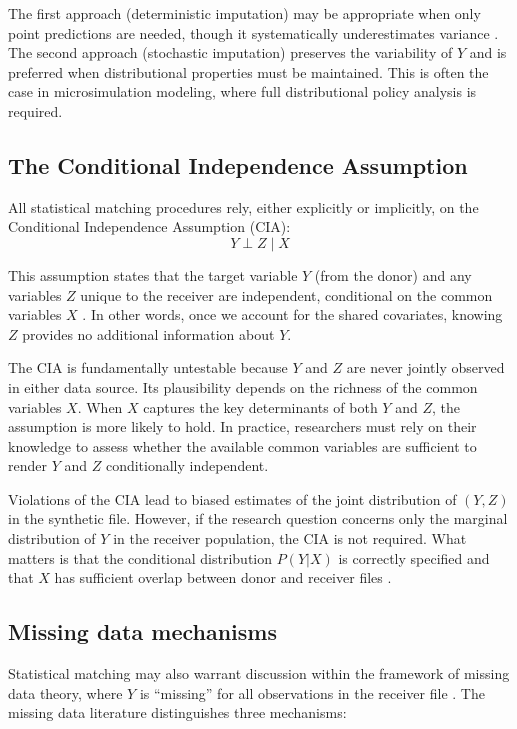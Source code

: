 The first approach (deterministic imputation) may be appropriate when only point predictions are needed, though it systematically underestimates variance \citep{rubin1987multiple}. The second approach (stochastic imputation) preserves the variability of $Y$ and is preferred when distributional properties must be maintained. This is often the case in microsimulation modeling, where full distributional policy analysis is required.

\subsection{The Conditional Independence Assumption}\label{sec:cia}

All statistical matching procedures rely, either explicitly or implicitly, on the Conditional Independence Assumption (CIA):
\begin{equation}
    Y \perp Z \mid X
\end{equation}

This assumption states that the target variable $Y$ (from the donor) and any variables $Z$ unique to the receiver are independent, conditional on the common variables $X$ \citep{dorazio2006statistical}. In other words, once we account for the shared covariates, knowing $Z$ provides no additional information about $Y$.

The CIA is fundamentally untestable because $Y$ and $Z$ are never jointly observed in either data source. Its plausibility depends on the richness of the common variables $X$. When $X$ captures the key determinants of both $Y$ and $Z$, the assumption is more likely to hold. In practice, researchers must rely on their knowledge to assess whether the available common variables are sufficient to render $Y$ and $Z$ conditionally independent.

Violations of the CIA lead to biased estimates of the joint distribution of $(Y, Z)$ in the synthetic file. However, if the research question concerns only the marginal distribution of $Y$ in the receiver population, the CIA is not required. What matters is that the conditional distribution $P(Y|X)$ is correctly specified and that $X$ has sufficient overlap between donor and receiver files \citep{dorazio2021statistical}.

\subsection{Missing data mechanisms}

Statistical matching may also warrant discussion within the framework of missing data theory, where $Y$ is ``missing'' for all observations in the receiver file \citep{little2002statistical}. The missing data literature distinguishes three mechanisms:

